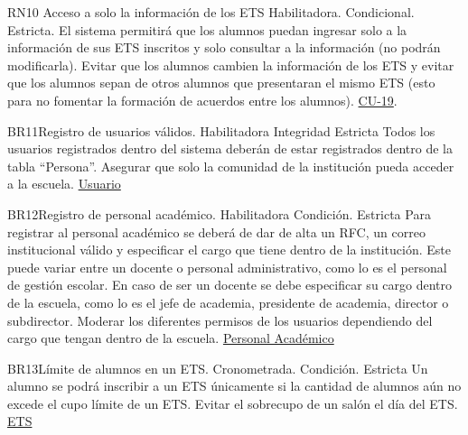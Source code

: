 \begin{BussinesRule}{RN10} {Acceso a solo la información de los ETS }
    \BRitem[Tipo:]Habilitadora.
    \BRitem[Clase:]Condicional.
    \BRitem[Nivel:] Estricta.
    \BRitem[Descripción:] El sistema permitirá que los alumnos puedan ingresar solo a la información de sus ETS inscritos y solo consultar a la información (no podrán modificarla).
    \BRitem[Motivación:] Evitar que los alumnos cambien la información de los ETS y evitar que los alumnos sepan de otros alumnos que presentaran el mismo ETS (esto para no fomentar la formación de acuerdos entre los alumnos).
     \hyperlink{CU-19}{CU-19}.
    \end{BussinesRule}


\begin{BussinesRule}{BR11}{Registro de usuarios válidos.} 
    \BRitem[Tipo:] Habilitadora
    \BRitem[Clase:] Integridad
    \BRitem[Nivel:] Estricta
    \BRitem[Descripción:] Todos los usuarios registrados dentro del sistema deberán de estar registrados dentro de la tabla “Persona”. 
    \BRitem[Motivación:] Asegurar que solo la comunidad de la institución pueda acceder a la escuela. 
     \hyperlink{Usuario}{Usuario} 
    \end{BussinesRule}

\begin{BussinesRule}{BR12}{Registro de personal académico.} 
    \BRitem[Tipo:] Habilitadora
    \BRitem[Clase:] Condición.
    \BRitem[Nivel:] Estricta
    \BRitem[Descripción:] Para registrar al personal académico se deberá de dar de alta un RFC, un correo institucional válido y especificar el cargo que tiene dentro de la institución. Este puede variar entre un docente o personal administrativo, como lo es el personal de gestión escolar. En caso de ser un docente se debe especificar su cargo dentro de la escuela, como lo es el jefe de academia, presidente de academia, director o subdirector. 
    \BRitem[Motivación:] Moderar los diferentes permisos de los usuarios dependiendo del cargo que tengan dentro de la escuela. 
     \hyperlink{PersonalAcademico}{Personal Académico} 
    \end{BussinesRule}

\begin{BussinesRule}{BR13}{Límite de alumnos en un ETS.} 
    \BRitem[Tipo:] Cronometrada. 
    \BRitem[Clase:] Condición.
    \BRitem[Nivel:] Estricta
    \BRitem[Descripción:] Un alumno se podrá inscribir a un ETS únicamente si la cantidad de alumnos aún no excede el cupo límite de un ETS.
    \BRitem[Motivación:] Evitar el sobrecupo de un salón el día del ETS.
     \hyperlink{ETS}{ETS} 
    \end{BussinesRule}
    
